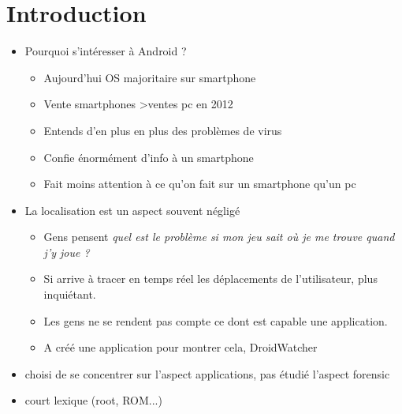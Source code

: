 
\section*{Introduction}
\label{sec:andro-into}

\begin{itemize}
\item Pourquoi s'intéresser à Android ?
  \begin{itemize}
  \item Aujourd'hui OS majoritaire sur smartphone
  \item Vente smartphones \textgreater ventes pc en 2012
  \item Entends d'en plus en plus des problèmes de virus
  \item Confie énormément d'info à un smartphone
  \item Fait moins attention à ce qu'on fait sur un smartphone qu'un pc
  \end{itemize}
\item La localisation est un aspect souvent négligé
  \begin{itemize}
  \item Gens pensent \emph{quel est le problème si mon jeu sait où je me trouve quand j'y joue ?}
  \item Si arrive à tracer en temps réel les déplacements de l'utilisateur, plus inquiétant.
  \item Les gens ne se rendent pas compte ce dont est capable une application.
  \item A créé une application pour montrer cela, DroidWatcher
  \end{itemize}
\item choisi de se concentrer sur l'aspect applications, pas étudié l'aspect forensic
\item court lexique (root, ROM...)
\end{itemize}